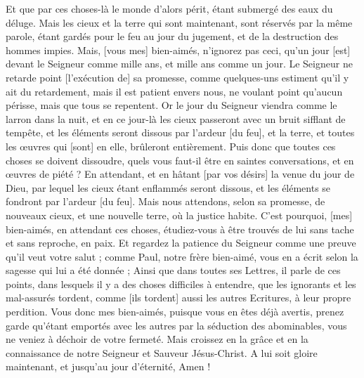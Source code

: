 \begin{multicols}{2}
Et que par ces choses-là le monde d'alors périt, étant submergé des eaux du déluge.
Mais les cieux et la terre qui sont maintenant, sont réservés par la même parole, étant gardés pour le feu au jour du jugement, et de la destruction des hommes impies.
Mais, [vous mes] bien-aimés, n'ignorez pas ceci, qu'un jour [est] devant le Seigneur comme mille ans, et mille ans comme un jour.
Le Seigneur ne retarde point [l'exécution de] sa promesse, comme quelques-uns estiment qu'il y ait du retardement, mais il est patient envers nous, ne voulant point qu'aucun périsse, mais que tous se repentent.
Or le jour du Seigneur viendra comme le larron dans la nuit, et en ce jour-là les cieux passeront avec un bruit sifflant de tempête, et les éléments seront dissous par l'ardeur [du feu], et la terre, et toutes les œuvres qui [sont] en elle, brûleront entièrement.
Puis donc que toutes ces choses se doivent dissoudre, quels vous faut-il être en saintes conversations, et en œuvres de piété ?
En attendant, et en hâtant [par vos désirs] la venue du jour de Dieu, par lequel les cieux étant enflammés seront dissous, et les éléments se fondront par l'ardeur [du feu].
Mais nous attendons, selon sa promesse, de nouveaux cieux, et une nouvelle terre, où la justice habite.
C'est pourquoi, [mes] bien-aimés, en attendant ces choses, étudiez-vous à être trouvés de lui sans tache et sans reproche, en paix.
Et regardez la patience du Seigneur comme une preuve qu'il veut votre salut ; comme Paul, notre frère bien-aimé, vous en a écrit selon la sagesse qui lui a été donnée ;
Ainsi que dans toutes ses Lettres, il parle de ces points, dans lesquels il y a des choses difficiles à entendre, que les ignorants et les mal-assurés tordent, comme [ils tordent] aussi les autres Ecritures, à leur propre perdition.
Vous donc mes bien-aimés, puisque vous en êtes déjà avertis, prenez garde qu'étant emportés avec les autres par la séduction des abominables, vous ne veniez à déchoir de votre fermeté.
Mais croissez en la grâce et en la connaissance de notre Seigneur et Sauveur Jésus-Christ. A lui soit gloire maintenant, et jusqu'au jour d'éternité, Amen !
\PPE{}
\end{multicols}
